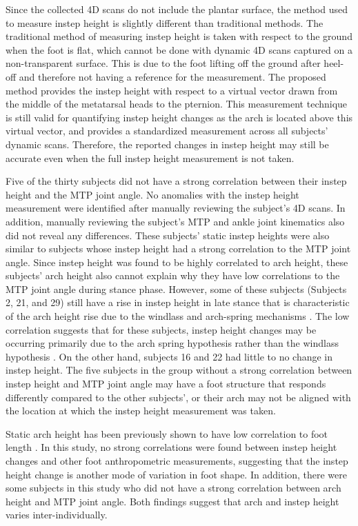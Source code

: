 \documentclass[defaultstyle,11pt]{thesis}
\begin{document}
Since the collected 4D scans do not include the plantar surface, the method used to measure instep height is slightly different than traditional methods.
The traditional method of measuring instep height is taken with respect to the ground when the foot is flat, which cannot be done with dynamic 4D scans captured on a non-transparent surface.
This is due to the foot lifting off the ground after heel-off and therefore not having a reference for the measurement.
The proposed method provides the instep height with respect to a virtual vector drawn from the middle of the metatarsal heads to the pternion.
This measurement technique is still valid for quantifying instep height changes as the arch is located above this virtual vector, and provides a standardized measurement across all subjects' dynamic scans.
Therefore, the reported changes in instep height may still be accurate even when the full instep height measurement is not taken.

Five of the thirty subjects did not have a strong correlation between their instep height and the MTP joint angle.
No anomalies with the instep height measurement were identified after manually reviewing the subject's 4D scans.
In addition, manually reviewing the subject's MTP and ankle joint kinematics also did not reveal any differences.
These subjects' static instep heights were also similar to subjects whose instep height had a strong correlation to the MTP joint angle.
Since instep height was found to be highly correlated to arch height, these subjects' arch height also cannot explain why they have low correlations to the MTP joint angle during stance phase.
However, some of these subjects (Subjects 2, 21, and 29) still have a rise in instep height in late stance that is characteristic of the arch height rise due to the windlass and arch-spring mechanisms \citep{Hicks1954, Ker1987}.
The low correlation suggests that for these subjects, instep height changes may be occurring primarily due to the arch spring hypothesis rather than the windlass hypothesis \citep{Ker1987}.
On the other hand, subjects 16 and 22 had little to no change in instep height.
The five subjects in the group without a strong correlation between instep height and MTP joint angle may have a foot structure that responds differently compared to the other subjects', or their arch may not be aligned with the location at which the instep height measurement was taken.

Static arch height has been previously shown to have low correlation to foot length \citep{Hill2017}.
In this study, no strong correlations were found between instep height changes and other foot anthropometric measurements, suggesting that the instep height change is another mode of variation in foot shape.
In addition, there were some subjects in this study who did not have a strong correlation between arch height and MTP joint angle.
Both findings suggest that arch and instep height varies inter-individually.
\end{document}
